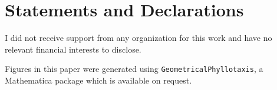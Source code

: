\documentclass[a4paper,10pt]{amsart}
\begin{document}
\section*{Statements and Declarations} 
I did not receive support from any organization for this work and have no relevant financial interests to disclose. 

Figures in this paper were generated using \texttt{GeometricalPhyllotaxis}, a Mathematica package which is available on request. 
\printbibliography
\end{document}
